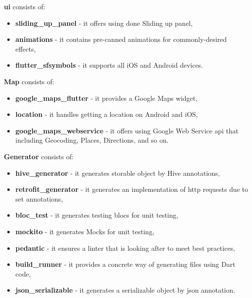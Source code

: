 \textbf{\acrshort{ui}} consists of:
\begin{itemize}
    \item \textbf{sliding\_up\_panel} - it offers using done Sliding up panel,
    \item \textbf{animations} - it contains pre-canned animations for commonly-desired effects,
    \item \textbf{flutter\_sfsymbols} - it supports all iOS and Android devices.
\end{itemize}
\textbf{Map} consists of:
\begin{itemize}
    \item \textbf{google\_maps\_flutter} - it provides a Google Maps widget,
    \item \textbf{location} - it handles getting a location on Android and iOS,
    \item \textbf{google\_maps\_webservice} - it offers using Google Web Service \acrshort{api} that including Geocoding, Places, Directions, and so on.
\end{itemize}
\textbf{Generator} consists of:
\begin{itemize}
    \item \textbf{hive\_generator} - it generates storable object by Hive annotations,
    \item \textbf{retrofit\_generator} - it generates an implementation of \acrshort{http} requests due to set annotations,
    \item \textbf{bloc\_test} - it generates testing blocs for unit testing,
    \item \textbf{mockito} - it generates Mocks for unit testing,
    \item \textbf{pedantic} - it ensures a linter that is looking after to meet best practices,
    \item \textbf{build\_runner} - it provides a concrete way of generating files using Dart code,
    \item \textbf{json\_serializable} - it generates a serializable object by \acrshort{json} annotation.
\end{itemize}
